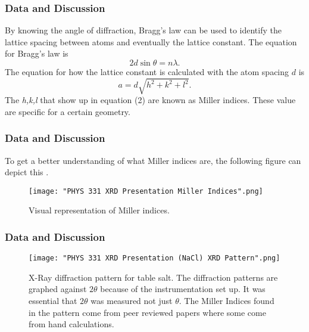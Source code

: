 \documentclass{beamer}
\begin{document}
\begin{frame}
\frametitle{Data and Discussion}
By knowing the angle of diffraction, Bragg's law can be used to identify the lattice spacing between atoms and eventually the lattice constant. The equation for Bragg's law is \cite{BraggsWiki}
\begin{equation}\label{1}
2d\sin{\theta}=n\lambda.
\end{equation}
The equation for how the lattice constant is calculated with the atom spacing $d$ is \cite{LatticeWiki}
\begin{equation}\label{2}
a=d\sqrt{h^2+k^2+l^2}.
\end{equation}
The \textit{h,k,l} that show up in equation (2) are known as Miller indices. These value are specific for a certain geometry.
\end{frame}


\begin{frame}
\frametitle{Data and Discussion}
To get a better understanding of what Miller indices are, the following figure can depict this \cite{MillerWiki}.
\begin{figure}[htbp]
\begin{center}
\texttt{[image: "PHYS 331 XRD Presentation Miller Indices".png]}
\caption{Visual representation of Miller indices.}
\label{default}
\end{center}
\end{figure}
\end{frame}


\begin{frame}
\frametitle{Data and Discussion}
\begin{figure}[htbp]
\begin{center}
\texttt{[image: "PHYS 331 XRD Presentation (NaCl) XRD Pattern".png]}
\caption{X-Ray diffraction pattern for table salt. The diffraction patterns are graphed against $2\theta$ because of the instrumentation set up. It was essential that $2\theta$ was measured not just $\theta$. The Miller Indices found in the pattern come from peer reviewed papers where some come from hand calculations.}
\label{default}
\end{center}
\end{figure}
\end{frame}
\end{document}
